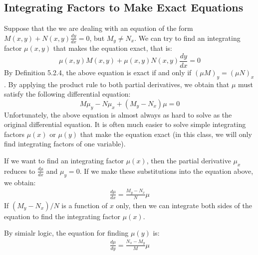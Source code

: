 \subsection{Integrating Factors to Make Exact Equations}

Suppose that the we are dealing with an equation of the form $M(x,y) + N(x,y)\frac{dy}{dx} = 0$, but $M_y \neq N_x$. We can try to find an integrating factor $\mu(x,y)$ that makes the equation exact, that is:
\[ \mu(x,y)M(x,y) + \mu(x,y)N(x,y)\frac{dy}{dx} = 0 \]
By Definition 5.2.4, the above equation is exact if and only if $(\mu M)_y = (\mu N)_x$. By applying the product rule to both partial derivatives, we obtain that $\mu$ must satisfy the following differential equation:
\[ M\mu_y - N\mu_x + (M_y - N_x)\mu = 0 \]
Unfortunately, the above equation is almost always as hard to solve as the original differential equation. It is often much easier to solve simple integrating factors $\mu(x)$ or $\mu(y)$ that make the equation exact (in this class, we will only find integrating factors of one variable). 

If we want to find an integrating factor $\mu(x)$, then the partial derivative $\mu_x$ reduces to $\frac{d\mu}{dx}$ and $\mu_y = 0$. If we make these substitutions into the equation above, we obtain:
\begin{align}
   \frac{d\mu}{dx} = \frac{M_y - N_x}{N}\mu 
\end{align}
If $(M_y - N_x)/N$ is a function of $x$ only, then we can integrate both sides of the equation to find the integrating factor $\mu(x)$.

By simialr logic, the equation for finding $\mu(y)$ is:
\begin{align}
   \frac{d\mu}{dy} = \frac{N_x - M_y}{M}\mu
\end{align}

